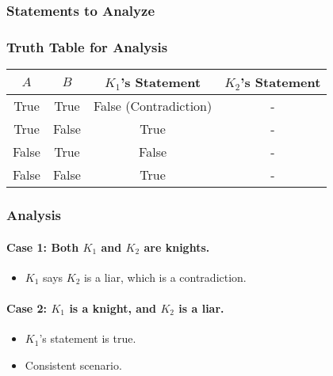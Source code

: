 \documentclass{article}
\begin{document}
\subsubsection{Statements to Analyze}

\subsubsection{Truth Table for Analysis}
\begin{center}
    \begin{tabular}{|c|c|c|c|}
        \hline
        $A$ & $B$ & $K_1$'s Statement & $K_2$'s Statement \\
        \hline
        True & True & False (Contradiction) & - \\
        True & False & True & - \\
        False & True & False & - \\
        False & False & True & - \\
        \hline
    \end{tabular}
\end{center}

\subsubsection{Analysis}
\paragraph{Case 1: Both $K_1$ and $K_2$ are knights.}
\begin{itemize}
    \item $K_1$ says $K_2$ is a liar, which is a contradiction.
\end{itemize}

\paragraph{Case 2: $K_1$ is a knight, and $K_2$ is a liar.}
\begin{itemize}
    \item $K_1$'s statement is true.
    \item Consistent scenario.
\end{itemize}
\end{document}
